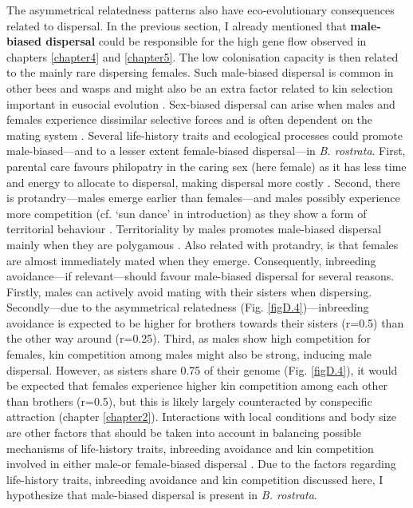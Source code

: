 \documentclass[10pt, twoside]{book} %
\begin{document}
	The asymmetrical relatedness patterns also have eco-evolutionary consequences related to dispersal. In the previous section, I already mentioned that \textbf{male-biased dispersal} could be responsible for the high gene flow observed in chapters \ref{chapter4} and \ref{chapter5}. The low colonisation capacity is then related to the mainly rare dispersing females. Such male-biased dispersal is common in other bees and wasps and might also be an extra factor related to kin selection important in eusocial evolution \citep{johnstone2012}. Sex-biased dispersal can arise when males and females experience dissimilar selective forces and is often dependent on the mating system \citep{trochet2016}. Several life-history traits and ecological processes could promote male-biased---and to a lesser extent female-biased dispersal---in \textit{B. rostrata}. First, parental care favours philopatry in the caring sex (here female) as it has less time and energy to allocate to dispersal, making dispersal more costly \citep{bonte2012, trochet2016}. Second, there is protandry---males emerge earlier than females---and males possibly experience more competition (cf. `sun dance' in introduction) as they show a form of territorial behaviour \citep{asis2006}. Territoriality by males promotes male-biased dispersal mainly when they are polygamous \citep{trochet2016}. Also related with protandry, is that females are almost immediately mated when they emerge. Consequently, inbreeding avoidance---if relevant---should favour male-biased dispersal for several reasons. Firstly, males can actively avoid mating with their sisters when dispersing. Secondly---due to the asymmetrical relatedness (Fig. \ref{figD.4})---inbreeding avoidance is expected to be higher for brothers towards their sisters (r=0.5) than the other way around (r=0.25). Third, as males show high competition for females, kin competition among males might also be strong, inducing male dispersal. However, as sisters share 0.75 of their genome (Fig. \ref{figD.4}), it would be expected that females experience higher kin competition among each other than brothers (r=0.5), but this is likely largely counteracted by conspecific attraction (chapter \ref{chapter2}). Interactions with local conditions and body size are other factors that should be taken into account in balancing possible mechanisms of life-history traits, inbreeding avoidance and kin competition involved in either male-or female-biased dispersal \citep{moore2006}. Due to the factors regarding life-history traits, inbreeding avoidance and kin competition discussed here, I hypothesize that male-biased dispersal is present in \textit{B. rostrata}.\\
	
\end{document}
